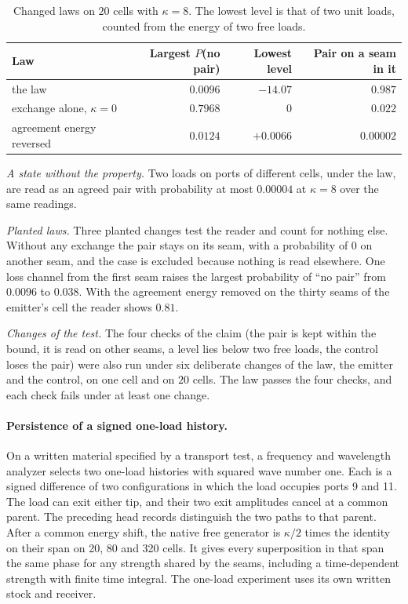 \documentclass[11pt]{article}
\theoremstyle{definition}
\theoremstyle{remark}
\theoremstyle{plain}
\begin{document}
\begin{table}[!htb]
\centering
\caption{Changed laws on $20$ cells with $\kappa=8$. The lowest level is
that of two unit loads, counted from the energy of two free loads.}
\label{tab:controls}
\begin{tabular}{@{}lrrr@{}}
\toprule
Law & Largest $P$(no pair) & Lowest level & Pair on a seam in it \\
\midrule
the law & $0.0096$ & $-14.07$ & $0.987$ \\
exchange alone, $\kappa=0$ & $0.7968$ & $0$ & $0.022$ \\
agreement energy reversed & $0.0124$ & $+0.0066$ & $0.00002$ \\
\bottomrule
\end{tabular}
\end{table}

\emph{A state without the property.} Two loads on ports of different cells,
under the law, are read as an agreed pair with probability at most
$0.00004$ at $\kappa=8$ over the same readings.

\emph{Planted laws.} Three planted changes test the reader and count for
nothing else. Without any exchange the pair stays on its seam, with a
probability of $0$ on another seam, and the case is excluded because
nothing is read elsewhere. One loss channel from the first seam raises the
largest probability of ``no pair'' from $0.0096$ to $0.038$. With the
agreement energy removed on the thirty seams of the emitter's cell the
reader shows $0.81$.

\emph{Changes of the test.} The four checks of the claim (the pair is kept
within the bound, it is read on other seams, a level lies below two free
loads, the control loses the pair) were also run under six deliberate
changes of the law, the emitter and the control, on one cell and on $20$
cells. The law passes the four checks, and each check fails under at least
one change.

\paragraph{Persistence of a signed one-load history.}
On a written material specified by a transport test, a frequency and
wavelength analyzer selects two one-load histories with squared wave
number one. Each is a signed difference of two configurations in
which the load occupies ports 9 and 11. The load can exit either
tip, and their two exit amplitudes cancel at a common parent. The
preceding head records distinguish the two paths to that parent.
After a common energy shift, the native free generator is
\(\kappa/2\) times the identity on their span on 20, 80 and 320 cells.
It gives every superposition in that span the same phase for any
strength shared by the seams, including a time-dependent strength
with finite time integral. The one-load experiment uses its own
written stock and receiver.
\end{document}
